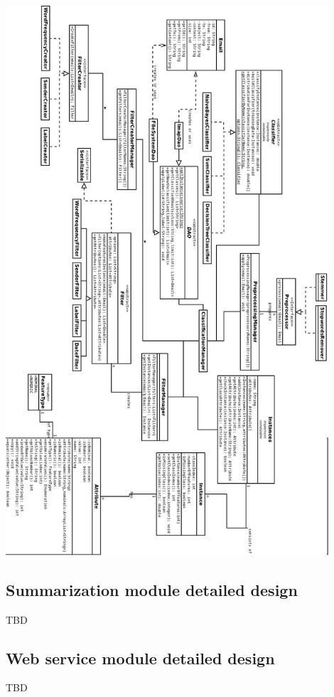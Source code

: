 \includegraphics[width=12cm]{design.jpeg}\\



\subsection{Summarization module detailed design}
TBD

\subsection{Web service module detailed design}
TBD
